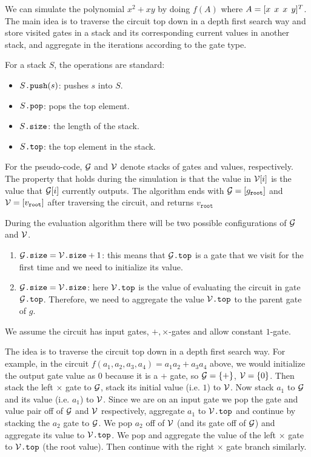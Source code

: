 We can simulate the polynomial $x^2+xy$ by doing $f(A)$ where $A=[x \hspace{1ex} x \hspace{1ex} x \hspace{1ex} y]^T$. The main idea is to traverse the circuit top down in a depth first search way and store visited gates in a stack and its corresponding current values in another stack, and aggregate in the iterations according to the gate type.

For a stack $S$, the operations are standard:

\begin{itemize}
	\item $S\texttt{.push}(s)$: pushes $s$ into $S$.
	\item $S\texttt{.pop}$: pops the top element.
	\item $S\texttt{.size}$: the length of the stack.
	\item $S\texttt{.top}$: the top element in the stack.
\end{itemize}

For the pseudo-code, $\mathcal{G}$ and $\mathcal{V}$ denote stacks of gates and values, respectively. The property that holds during the simulation is that the value in $\mathcal{V}[i]$ is the value that $\mathcal{G}[i]$ currently outputs. The algorithm ends with $\mathcal{G}=\left[ g_{\texttt{root}}\right]$ and $\mathcal{V}=\left[ v_{\texttt{root}}\right]$ after traversing the circuit, and returns $v_{\texttt{root}}$

During the evaluation algorithm there will be two possible configurations of $\mathcal{G}$ and $\mathcal{V}$.

\begin{enumerate}
	\item $\mathcal{G}\texttt{.size} = \mathcal{V}\texttt{.size} + 1$: this means that $\mathcal{G}\texttt{.top}$ is a gate that we visit for the first time and we need to initialize its value.
	
	\item $\mathcal{G}\texttt{.size} = \mathcal{V}\texttt{.size}$: here $\mathcal{V}\texttt{.top}$ is the value of evaluating the circuit in gate $\mathcal{G}\texttt{.top}$. Therefore, we need to aggregate the value $\mathcal{V}\texttt{.top}$ to the parent gate of $g$.
\end{enumerate}

We assume the circuit has input gates, $+, \times$-gates and allow constant $1$-gate.

The idea is to traverse the circuit top down in a depth first search way. For example, in the circuit $f(a_1,a_2,a_3,a_4)=a_1a_2 +a_3a_4$ above, we would initialize the output gate value as $0$ because it is a $+$ gate, so $\mathcal{G}=\lbrace +\rbrace$, $\mathcal{V}=\lbrace 0\rbrace$. Then stack the left $\times$ gate to $\mathcal{G}$, stack its initial value (i.e. $1$) to $\mathcal{V}$. Now stack $a_1$ to $\mathcal{G}$ and its value (i.e. $a_1$) to $\mathcal{V}$. Since we are on an input gate we pop the gate and value pair off of $\mathcal{G}$ and $\mathcal{V}$ respectively, aggregate $a_1$ to $\mathcal{V}\texttt{.top}$ and continue by stacking the $a_2$ gate to $\mathcal{G}$. We pop $a_2$ off of $\mathcal{V}$ (and its gate off of $\mathcal{G}$) and aggregate its value to $\mathcal{V}\texttt{.top}$. We pop and aggregate the value of the left $\times$ gate to $\mathcal{V}\texttt{.top}$ (the root value). Then continue with the right $\times$ gate branch similarly.

